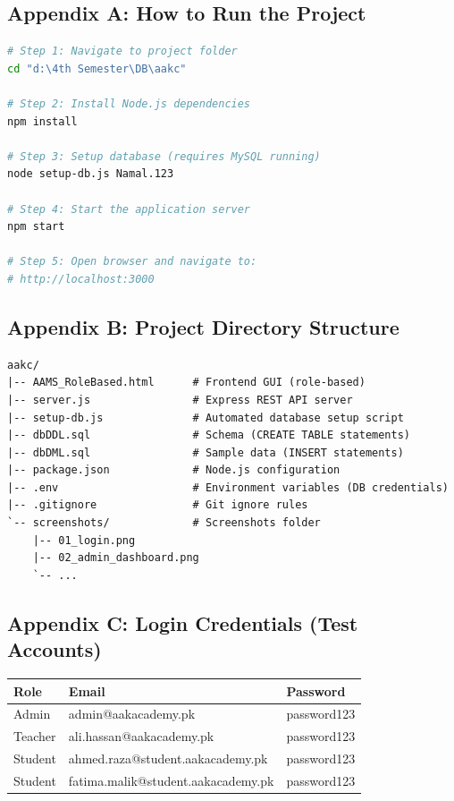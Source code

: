 \documentclass[12pt,a4paper]{report}
\begin{document}
\subsection*{Appendix A: How to Run the Project}

\begin{lstlisting}[language=bash, caption={Setup and run commands}]
# Step 1: Navigate to project folder
cd "d:\4th Semester\DB\aakc"

# Step 2: Install Node.js dependencies
npm install

# Step 3: Setup database (requires MySQL running)
node setup-db.js Namal.123

# Step 4: Start the application server
npm start

# Step 5: Open browser and navigate to:
# http://localhost:3000
\end{lstlisting}

\subsection*{Appendix B: Project Directory Structure}

\begin{lstlisting}[caption={Project files and folders}]
aakc/
|-- AAMS_RoleBased.html      # Frontend GUI (role-based)
|-- server.js                # Express REST API server
|-- setup-db.js              # Automated database setup script
|-- dbDDL.sql                # Schema (CREATE TABLE statements)
|-- dbDML.sql                # Sample data (INSERT statements)
|-- package.json             # Node.js configuration
|-- .env                     # Environment variables (DB credentials)
|-- .gitignore               # Git ignore rules
`-- screenshots/             # Screenshots folder
    |-- 01_login.png
    |-- 02_admin_dashboard.png
    `-- ...
\end{lstlisting}

\subsection*{Appendix C: Login Credentials (Test Accounts)}

\begin{longtable}{|L{3cm}|L{5.5cm}|L{4cm}|}
\hline
\textbf{Role} & \textbf{Email} & \textbf{Password} \\
\hline
Admin & admin@aakacademy.pk & password123 \\
\hline
Teacher & ali.hassan@aakacademy.pk & password123 \\
\hline
Student & ahmed.raza@student.aakacademy.pk & password123 \\
\hline
Student & fatima.malik@student.aakacademy.pk & password123 \\
\hline
\end{longtable}
\end{document}
